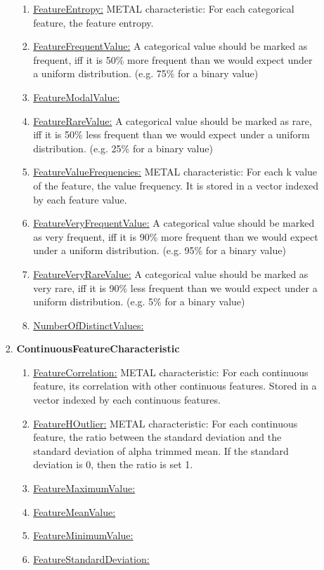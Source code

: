 \documentclass[a4paper,12pt, english]{article}
\begin{document}
\begin{enumerate}
\begin{enumerate}
\begin{enumerate}
\begin{enumerate}
			\item \underline{FeatureEntropy:} METAL characteristic: For each categorical feature, the feature entropy.
			\item \underline{FeatureFrequentValue:} A categorical value should be marked as frequent, iff it is 50\% more frequent than we would expect under a uniform distribution. (e.g. 75\% for a binary value)
			\item \underline{FeatureModalValue:}
			\item \underline{FeatureRareValue:} A categorical value should be marked as rare, iff it is 50\% less frequent than we would expect under a uniform distribution. (e.g. 25\% for a binary value)
			\item \underline{FeatureValueFrequencies:} METAL characteristic: For each k value of the feature, the value frequency. It is stored in a vector indexed by each feature value. 
			\item \underline{FeatureVeryFrequentValue:} A categorical value should be marked as very frequent, iff it is 90\% more frequent than we would expect under a uniform distribution. (e.g. 95\% for a binary value)
			\item \underline{FeatureVeryRareValue:} A categorical value should be marked as very rare, iff it is 90\% less frequent than we would expect under a uniform distribution. (e.g. 5\% for a binary value)
			\item \underline{NumberOfDistinctValues:}
			\end{enumerate}		
		\item \textbf{ContinuousFeatureCharacteristic}
			\begin{enumerate}
			\item \underline{FeatureCorrelation:} METAL characteristic: For each continuous feature, its correlation with other continuous features. Stored in a vector indexed by each continuous features.
			\item \underline{FeatureHOutlier:} METAL characteristic: For each continuous feature, the ratio between the standard deviation and the standard deviation of alpha trimmed mean. If the standard deviation is 0, then the ratio is set 1.
			\item \underline{FeatureMaximumValue:}
			\item \underline{FeatureMeanValue:}
			\item \underline{FeatureMinimumValue:}
			\item \underline{FeatureStandardDeviation:}
			\end{enumerate}		

\end{enumerate}
\end{enumerate}
\end{enumerate}
\end{document}
